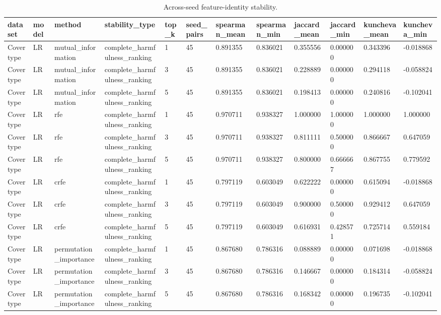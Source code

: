 \begin{table}[t]
\centering
\caption{Across-seed feature-identity stability.}
\label{tab:rank-stability}
\begin{tabular}{llllllllllll}
\hline
dataset & model & method & stability\_type & top\_k & seed\_pairs & spearman\_mean & spearman\_min & jaccard\_mean & jaccard\_min & kuncheva\_mean & kuncheva\_min \\
\hline
Covertype & LR & mutual\_information & complete\_harmfulness\_ranking & 1 & 45 & 0.891355 & 0.836021 & 0.355556 & 0.000000 & 0.343396 & -0.018868 \\
Covertype & LR & mutual\_information & complete\_harmfulness\_ranking & 3 & 45 & 0.891355 & 0.836021 & 0.228889 & 0.000000 & 0.294118 & -0.058824 \\
Covertype & LR & mutual\_information & complete\_harmfulness\_ranking & 5 & 45 & 0.891355 & 0.836021 & 0.198413 & 0.000000 & 0.240816 & -0.102041 \\
Covertype & LR & rfe & complete\_harmfulness\_ranking & 1 & 45 & 0.970711 & 0.938327 & 1.000000 & 1.000000 & 1.000000 & 1.000000 \\
Covertype & LR & rfe & complete\_harmfulness\_ranking & 3 & 45 & 0.970711 & 0.938327 & 0.811111 & 0.500000 & 0.866667 & 0.647059 \\
Covertype & LR & rfe & complete\_harmfulness\_ranking & 5 & 45 & 0.970711 & 0.938327 & 0.800000 & 0.666667 & 0.867755 & 0.779592 \\
Covertype & LR & crfe & complete\_harmfulness\_ranking & 1 & 45 & 0.797119 & 0.603049 & 0.622222 & 0.000000 & 0.615094 & -0.018868 \\
Covertype & LR & crfe & complete\_harmfulness\_ranking & 3 & 45 & 0.797119 & 0.603049 & 0.900000 & 0.500000 & 0.929412 & 0.647059 \\
Covertype & LR & crfe & complete\_harmfulness\_ranking & 5 & 45 & 0.797119 & 0.603049 & 0.616931 & 0.428571 & 0.725714 & 0.559184 \\
Covertype & LR & permutation\_importance & complete\_harmfulness\_ranking & 1 & 45 & 0.867680 & 0.786316 & 0.088889 & 0.000000 & 0.071698 & -0.018868 \\
Covertype & LR & permutation\_importance & complete\_harmfulness\_ranking & 3 & 45 & 0.867680 & 0.786316 & 0.146667 & 0.000000 & 0.184314 & -0.058824 \\
Covertype & LR & permutation\_importance & complete\_harmfulness\_ranking & 5 & 45 & 0.867680 & 0.786316 & 0.168342 & 0.000000 & 0.196735 & -0.102041 \\

\end{tabular}
\end{table}
